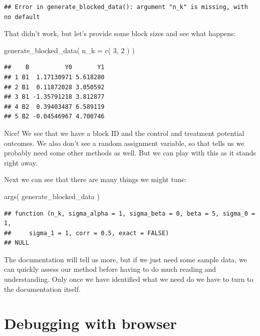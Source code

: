 \documentclass[
]{book}
\newenvironment{Shaded}{\begin{snugshade}}{\end{snugshade}}
\newcommand{\AttributeTok}[1]{\textcolor[rgb]{0.77,0.63,0.00}{#1}}
\newcommand{\DecValTok}[1]{\textcolor[rgb]{0.00,0.00,0.81}{#1}}
\newcommand{\FunctionTok}[1]{\textcolor[rgb]{0.00,0.00,0.00}{#1}}
\newcommand{\NormalTok}[1]{#1}
\begin{document}
\begin{verbatim}
## Error in generate_blocked_data(): argument "n_k" is missing, with no default
\end{verbatim}

That didn't work, but let's provide some block sizes and see what happens:

\begin{Shaded}
\begin{Highlighting}[]
\FunctionTok{generate\_blocked\_data}\NormalTok{( }\AttributeTok{n\_k =} \FunctionTok{c}\NormalTok{( }\DecValTok{3}\NormalTok{, }\DecValTok{2}\NormalTok{ ) )}
\end{Highlighting}
\end{Shaded}

\begin{verbatim}
##    B          Y0       Y1
## 1 B1  1.17130971 5.618280
## 2 B1  0.11872028 3.050592
## 3 B1 -1.35791218 3.812877
## 4 B2  0.39403487 6.589119
## 5 B2 -0.04546967 4.700746
\end{verbatim}

Nice! We see that we have a block ID and the control and treatment potential outcomes. We also don't see a random assignment variable, so that tells us we probably need some other methods as well.
But we can play with this as it stands right away.

Next we can see that there are many things we might tune:

\begin{Shaded}
\begin{Highlighting}[]
\FunctionTok{args}\NormalTok{( generate\_blocked\_data )}
\end{Highlighting}
\end{Shaded}

\begin{verbatim}
## function (n_k, sigma_alpha = 1, sigma_beta = 0, beta = 5, sigma_0 = 1, 
##     sigma_1 = 1, corr = 0.5, exact = FALSE) 
## NULL
\end{verbatim}

The documentation will tell us more, but if we just need some sample data, we can quickly assess our method before having to do much reading and understanding.
Only once we have identified what we need do we have to turn to the documentation itself.

\hypertarget{debugging-with-browser}{%
\section{Debugging with browser}\label{debugging-with-browser}}
\end{document}
